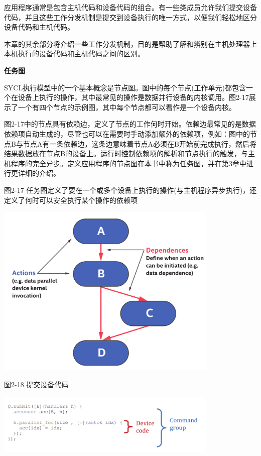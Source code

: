 应用程序通常是包含主机代码和设备代码的组合。有一些类成员允许我们提交设备代码，并且这些工作分发机制是提交到设备执行的唯一方式，以便我们轻松地区分设备代码和主机代码。\par

本章的其余部分将介绍一些工作分发机制，目的是帮助了解和辨别在主机处理器上本机执行的设备代码和主机代码之间的区别。\par

\hspace*{\fill} \par %
\textbf{任务图}

SYCL执行模型中的一个基本概念是节点图。图中的每个节点(工作单元)都包含一个在设备上执行的操作，其中最常见的操作是数据并行设备的内核调用。图2-17展示了一个有四个节点的示例图，其中每个节点都可以看作是一个设备内核。\par

图2-17中的节点具有依赖边，定义了节点的工作何时开始。依赖边最常见的是数据依赖项自动生成的，尽管也可以在需要时手动添加额外的依赖项，例如：图中的节点B与节点A有一条依赖边，这条边意味着节点A必须在B开始前完成执行，然后将结果数据放在节点B的设备上。运行时控制依赖项的解析和节点执行的触发，与主机程序的完全异步。定义应用程序的节点图在本书中称为任务图，并在第3章中进行更详细的介绍。\par

\hspace*{\fill} \par %
图2-17 任务图定义了要在一个或多个设备上执行的操作(与主机程序异步执行)，还定义了何时可以安全执行某个操作的依赖项
\begin{center}
	\includegraphics[width=0.8\textwidth]{content/chapter-2/images/10}
\end{center}

\hspace*{\fill} \par %
图2-18 提交设备代码
\begin{center}
	\includegraphics[width=0.8\textwidth]{content/chapter-2/images/11}
\end{center}

